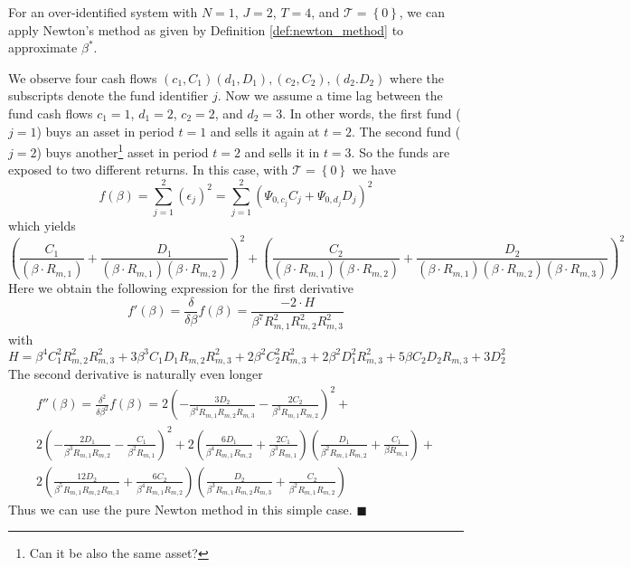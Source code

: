 \begin{example}
	\label{ex:simple_linear_derivates_newton}
	For an over-identified system with $N=1$, $J=2$, $T=4$, and $\mathcal{T} = \left\{ 0 \right\}$, we can apply Newton's method as given by Definition \ref{def:newton_method} to approximate $\beta^*$. 
	
	We observe four cash flows $(c_1, C_1) (d_1, D_1), (c_2, C_2), (d_2. D_2)$ where the subscripts denote the fund identifier $j$.
	Now we assume a time lag between the fund cash flows $c_1=1$, $d_1=2$, $c_2=2$, and $d_2=3$.
	In other words, the first fund ($j=1$) buys an asset in period $t=1$ and sells it again at $t=2$.
	The second fund ($j=2$) buys another\footnote{Can it be also the same asset?} asset in period $t=2$ and sells it in $t=3$.
	So the funds are exposed to two different returns.
	In this case, with $\mathcal{T} = \left\{ 0 \right\}$ we have
	\[
	f (\beta) = 
	\sum_{j=1}^2 \left( \epsilon_j \right)^2 = 
	\sum_{j=1}^2
	\left( 
	\Psi_{0,c_j} C_j + 	\Psi_{0,d_j} D_j 
	\right)^2
	\]
	which yields
	\[
	\left( 
	\frac{C_1}{ \left( \beta \cdot R_{m,1} \right)} + 
	\frac{D_1}{ \left( \beta \cdot R_{m,1} \right) \left( \beta \cdot R_{m,2} \right) }
	\right)^2
	+
	\left( 
	\frac{C_2}{ \left( \beta \cdot R_{m,1} \right) \left( \beta \cdot R_{m,2} \right)} + 
	\frac{D_2}{ \left( \beta \cdot R_{m,1} \right) \left( \beta \cdot R_{m,2} \right) \left( \beta \cdot R_{m,3} \right) }
	\right)^2
	\]
	Here we obtain the following expression for the first derivative
	\[
	f'(\beta) = 
	\frac{\delta}{\delta \beta} f(\beta) =
	\frac{ -2 \cdot H }{\beta^7 R_{m,1}^2 R_{m,2}^2 R_{m,3}^2}
	\]
	with
	\[
	H = 
	\beta^4 C_1^2 R_{m,2}^2 R_{m,3}^2 + 3 \beta^3 C_1 D_1 R_{m,2} R_{m,3}^2 + 2 \beta^2 C_2^2 R_{m,3}^2
	+
	2 \beta^2 D_1^2 R_{m,3}^2 + 5 \beta C_2 D_2 R_{m,3} + 3 D_2^2
	\]
	The second derivative is naturally even longer
	\begin{multline}
		f''(\beta) = 
		\frac{\delta^2}{\delta \beta^2} f(\beta) =
		2 \left( - \frac{3 D_2}{\beta^4 R_{m,1} R_{m,2} R_{m,3} } - \frac{2 C_2}{\beta^3 R_{m,1} R_{m,2}} \right)^2 +  \\
		2 \left( - \frac{2 D_1}{\beta^3 R_{m,1} R_{m,2} } - \frac{C_1}{\beta^2 R_{m,1} } \right)^2 + 
		2 \left( \frac{6 D_1}{\beta^4 R_{m,1} R_{m,2} } + \frac{ 2 C_1}{\beta^3 R_{m,1} } \right)
		\left( \frac{D_1}{\beta^2 R_{m,1} R_{m,2} } + \frac{ C_1}{\beta R_{m,1} } \right) + \\
		2 \left( \frac{12 D_2}{\beta^5 R_{m,1} R_{m,2} R_{m,3} } + \frac{ 6 C_2}{\beta^4 R_{m,1} R_{m,2} } \right)
		\left( \frac{D_2}{\beta^3 R_{m,1} R_{m,2} R_{m,3} } + \frac{C_2}{\beta^2 R_{m,1} R_{m,2} } \right)
	\end{multline}
	Thus we can use the pure Newton method in this simple case. 
	$\blacksquare$
\end{example}


